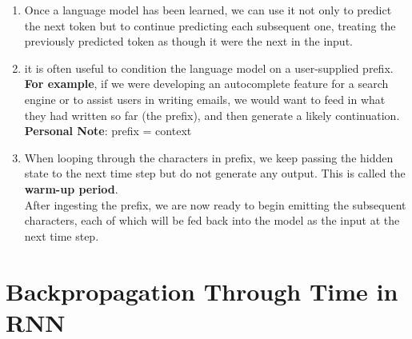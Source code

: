 \begin{enumerate}
    \item Once a language model has been learned, we can use it not only to predict the next token but to continue predicting each subsequent one, treating the previously predicted token as though it were the next in the input.

    \item it is often useful to condition the language model on a user-supplied prefix. \\
    \textbf{For example}, if we were developing an autocomplete feature for a search engine or to assist users in writing emails, we would want to feed in what they had written so far (the prefix), and then generate a likely continuation.\\
    \textbf{Personal Note}: prefix = context

    \item When looping through the characters in prefix, we keep passing the hidden state to the next time step but do not generate any output. This is called the \textbf{warm-up period}. \\
    After ingesting the prefix, we are now ready to begin emitting the subsequent characters, each of which will be fed back into the model as the input at the next time step.

\end{enumerate}


\section{Backpropagation Through Time in RNN \cite{dnn-1}}

